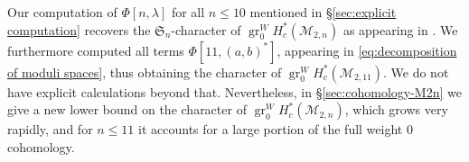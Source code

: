 \documentclass[12pt]{article}
\newcommand{\Q}{\mathbb{Q}}
\newcommand{\R}{\mathbb{R}}
\newcommand{\SymGroup}[1][n]{\mathfrak{S}_{#1}}
\newcommand{\TransposePartition}[1]{{#1}^{\ast}}
\newcommand{\ModuliCurve}[1]{\mathcal{M}_{#1}}
\newcommand{\sgn}[1][n]{\operatorname{sgn}_{#1}}
\DeclareMathOperator{\gr}{gr}
\theoremstyle{plain}
\newtheorem{cor}[thm]{Corollary}
\theoremstyle{definition}
\theoremstyle{remark}
\begin{document}
Our computation of $\Phi[n,\lambda]$ for all $n\leq 10$ mentioned in \S\ref{sec:explicit computation} recovers the $\SymGroup$-character of $\gr^W_0 H^*_c(\ModuliCurve{2,n})$ as appearing in \cite{BCGY21}. We furthermore computed all terms $\Phi[11,\TransposePartition{(a,b)}]$, appearing in \eqref{eq:decomposition of moduli spaces}, thus obtaining the character of $\gr^W_0 H^*_c(\ModuliCurve{2,11})$. We do not have explicit calculations beyond that.
Nevertheless, in \S\ref{sec:cohomology-M2n} we give a new lower bound on the character of $\gr^W_0 H^*_c(\ModuliCurve{2,n})$, which grows very rapidly, and for $n\leq 11$ it accounts for a large portion of the full weight $0$ cohomology. %
%
%

\end{document}
